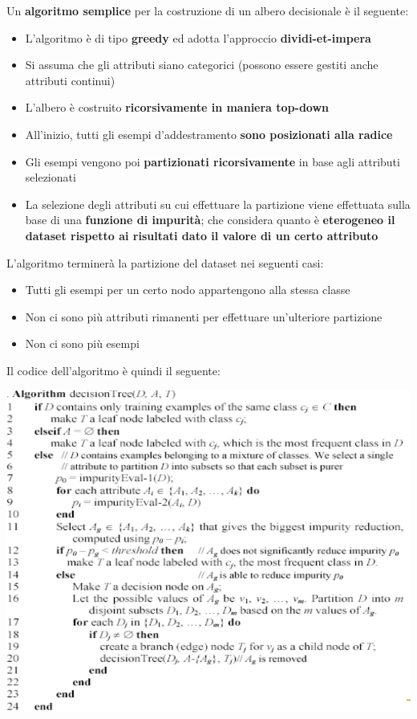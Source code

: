 \documentclass[12pt]{article}
\begin{document}
Un \textbf{algoritmo semplice} per la costruzione di un albero decisionale è il seguente:
\begin{itemize}
    \item L'algoritmo è di tipo \textbf{greedy} ed adotta l'approccio \textbf{dividi-et-impera}
    \item Si assuma che gli attributi siano categorici (possono essere gestiti anche attributi continui)
    \item L'albero è costruito \textbf{ricorsivamente in maniera top-down}
    \item All'inizio, tutti gli esempi d'addestramento \textbf{sono posizionati alla radice}
    \item Gli esempi vengono poi \textbf{partizionati ricorsivamente} in base agli attributi selezionati
    \item La selezione degli attributi su cui effettuare la partizione viene effettuata sulla base di una \textbf{funzione di impurità}; che considera quanto è \textbf{eterogeneo il dataset rispetto ai risultati dato il valore di un certo attributo}
\end{itemize}
L'algoritmo terminerà la partizione del dataset nei seguenti casi:
\begin{itemize}
    \item Tutti gli esempi per un certo nodo appartengono alla stessa classe
    \item Non ci sono più attributi rimanenti per effettuare un'ulteriore partizione
    \item Non ci sono più esempi
\end{itemize}
Il codice dell'algoritmo è quindi il seguente:
\begin{center}
    \includegraphics[width =1\linewidth]{Images/73.PNG}
\end{center}
\end{document}
